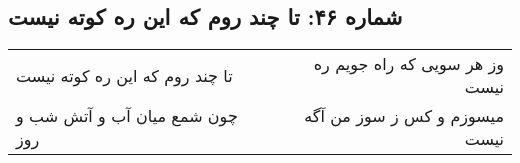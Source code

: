\begin{center}
\section*{شماره ۴۶: تا چند روم که این ره کوته نیست}
\label{sec:046}
\begin{longtable}{l p{0.5cm} r}
تا چند روم که این ره کوته نیست
&&
وز هر سویی که راه جویم ره نیست
\\
چون شمع میان آب و آتش شب و روز
&&
میسوزم و کس ز سوز من آگه نیست
\\
\end{longtable}
\end{center}
